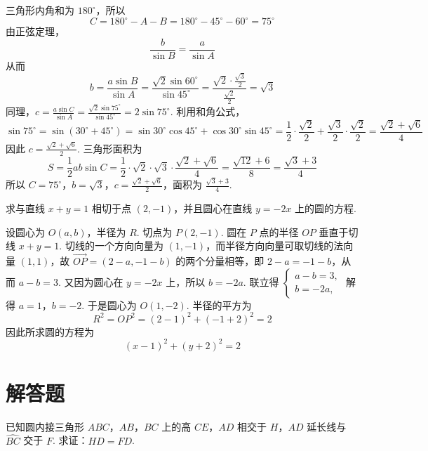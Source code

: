 \begin{solution}
三角形内角和为 \(180^{\circ}\)，所以
\[
C=180^{\circ}-A-B=180^{\circ}-45^{\circ}-60^{\circ}=75^{\circ}
\]
由正弦定理，
\[
\frac{b}{\sin B}=\frac{a}{\sin A}
\]
从而
\[
b=\frac{a\sin B}{\sin A}=\frac{\sqrt{2}\sin60^{\circ}}{\sin45^{\circ}}=\frac{\sqrt{2}\cdot\frac{\sqrt{3}}{2}}{\frac{\sqrt{2}}{2}}=\sqrt{3}
\]
同理，\(c=\frac{a\sin C}{\sin A}=\frac{\sqrt{2}\sin75^{\circ}}{\sin45^{\circ}}=2\sin75^{\circ}\).
利用和角公式，
\[
\sin75^{\circ}=\sin\left(30^{\circ}+45^{\circ}\right)
 =\sin30^{\circ}\cos45^{\circ}+\cos30^{\circ}\sin45^{\circ}
 =\frac{1}{2}\cdot\frac{\sqrt{2}}{2}+\frac{\sqrt{3}}{2}\cdot\frac{\sqrt{2}}{2}
 =\frac{\sqrt{2}+\sqrt{6}}{4}
\]
因此 \(c=\frac{\sqrt{2}+\sqrt{6}}{2}\).
三角形面积为
\[
S=\frac{1}{2}ab\sin C
 =\frac{1}{2}\cdot\sqrt{2}\cdot\sqrt{3}\cdot\frac{\sqrt{2}+\sqrt{6}}{4}
 =\frac{\sqrt{12}+6}{8}
 =\frac{\sqrt{3}+3}{4}
\]
所以 \(C=75^{\circ}\)，\(b=\sqrt{3}\)，\(c=\frac{\sqrt{2}+\sqrt{6}}{2}\)，面积为 \(\frac{\sqrt{3}+3}{4}\).
\end{solution}

\begin{problem}
求与直线 \(x+y=1\) 相切于点 \((2,-1)\)，并且圆心在直线 \(y=-2x\) 上的圆的方程.
\end{problem}

\begin{solution}
设圆心为 \(O(a,b)\)，半径为 \(R\). 切点为 \(P(2,-1)\). 圆在 \(P\) 点的半径 \(OP\) 垂直于切线 \(x+y=1\). 切线的一个方向向量为 \((1,-1)\)，而半径方向向量可取切线的法向量 \((1,1)\)，故
 \(\overrightarrow{OP}=(2-a,-1-b)\) 的两个分量相等，即 \(2-a=-1-b\)，从而 \(a-b=3\).
又因为圆心在 \(y=-2x\) 上，所以 \(b=-2a\). 联立得
 \(
\begin{cases}
a-b=3,\\
b=-2a,
\end{cases}
\) 解得 \(a=1\)，\(b=-2\).
于是圆心为 \(O(1,-2)\). 半径的平方为
\[
R^{2}=OP^{2}=\left(2-1\right)^{2}+\left(-1+2\right)^{2}=2
\]
因此所求圆的方程为
\[
\left(x-1\right)^{2}+\left(y+2\right)^{2}=2
\]
\end{solution}

\section{解答题}

\begin{problem}
已知圆内接三角形 \(ABC\)，\(AB\)，\(BC\) 上的高 \(CE\)，\(AD\) 相交于 \(H\)，\(AD\) 延长线与 \(\widehat{BC}\) 交于 \(F\). 求证：\(HD=FD\).

\end{problem}

